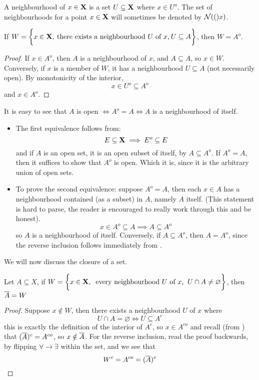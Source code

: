 \documentclass[../../main.tex]{subfiles}
\begin{document}
\begin{definition}\label{chp4:neighbourhood-definition}
    A neighbourhood of $x\in{\mathbf{X}}$ is a set $U\subseteq{\mathbf{X}}$ where $x\in U^o$. The set of neighbourhoods for a point $x\in{\mathbf{X}}$ will sometimes be denoted by $\mathcal{N}(()x)$.
\end{definition}
\begin{wts}
    If $W = \biggl\{{x\in{\mathbf{X}}, \: \text{there exists a neighbourhood $U$ of $x$,}\: U\subseteq A}\biggr\}$, then $W = A^o$.
\end{wts}
\begin{proof}
    If $x\in A^o$, then $A$ is a neighbourhood of $x$, and $A\subseteq A$, so $x\in W$. Conversely, if $x$ is a member of $W$, it has a neighbourhood $U\subseteq A$ (not necessarily open). By monotonicity of the interior,
    \[
        x\in U^o\subseteq A^o
    \]
    and $x\in A^o$.
\end{proof}
It is easy to see that $A$ is open $\iff A^o = A \iff A$ is a neighbourhood of itself. 
\begin{itemize}
    \item The first equivalence follows from:
    \[
        E\subseteq{\mathbf{X}}\implies E^o\subseteq E
    \]
    and if $A$ is an open set, it is an open subset of itself, by  $A\subseteq A^o$. If $A^o = A$, then it suffices to show that $A^o$ is open. Which it is, since it is the arbitrary union of open sets.
    \item To prove the second equivalence: suppose $A^o = A$, then each $x\in A$ has a neighbourhood contained (as a subset) in $A$, namely $A$ itself. (This statement is hard to parse, the reader is encouraged to really work through this and be honest).
    \[
        x\in A^o\subseteq A\implies A\subseteq A^o
    \]
    so $A$ is a neighbourhood of itself. Conversely, if $A\subseteq A^o$, then $A = A^o$, since the reverse inclusion follows immediately from .
\end{itemize}

\newpage

We will now discuss the closure of a set.
\begin{wts}\label{chp4:closure-adherent}
    Let $A\subseteq X$, if $W = \biggl\{{x\in{\mathbf{X}},\: \text{ every neighbourhood $U$ of $x$, }\: U\cap A\neq\varnothing}\biggr\}$, then $\overline{A}=W$
\end{wts}
\begin{proof}
    Suppose $x\notin W$, then there exists a neighbourhood $U$ of $x$ where
    \[
        U\cap A=\varnothing\iff U\subseteq A^c
    \]
    this is exactly the definition of the interior of $A^c$, so $x\in A^{co}$ and recall (from ) that $(\overline{A})^c = A^{co}$, so $x\notin \overline{A}$. For the reverse inclusion, read the proof backwards, by flipping $\forall\to\exists$ within the set, and we see that
    \[
        W^c = A^{co} = (\overline{A})^c
    \]
\end{proof}
\end{document}
